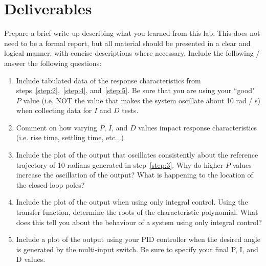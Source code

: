 \section{Deliverables}

Prepare a brief write up describing what you learned from this lab. This does not
need to be a formal report, but all material should be presented in a clear and logical manner,
with concise descriptions where necessary. Include the following / answer the following questions:
\begin{enumerate}
\item Include tabulated data of the response characteristics from steps~\ref{step:2},~\ref{step:4}, and~\ref{step:5}. 
Be sure that you are using your ``good" $P$ value (i.e. NOT the value that makes the system oscillate about 10 rad / s) when collecting data for $I$ and $D$ tests.
\item Comment on how varying $P$, $I$, and $D$ values impact response characteristics (i.e. rise time, settling time, etc...)
\item Include the plot of the output that oscillates consistently about the reference trajectory of 10 radians 
generated in step~\ref{step:3}. Why do higher $P$ values increase the oscillation of the output? What is 
happening to the location of the closed loop poles? 
\item Include the plot of the output when using only integral control. Using the transfer function, determine the roots
of the characteristic polynomial.  What does this tell you about the behaviour of a system using only integral control?
\item Include a plot of the output using your PID controller when the desired angle is generated by the multi-input 
switch. Be sure to specify your final P, I, and D values. 
\end{enumerate}


